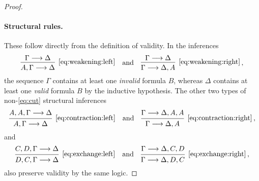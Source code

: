 \documentclass[11pt,a4paper]{article}
\begin{document}
\begin{proof}
    \paragraph{Structural rules.}
    These follow directly from the definition of validity.
    In the inferences
    \begin{equation*}
        \begin{prooftree}
            \hypo{\Gamma\seq\Delta}
            \infer1[\eqref{eq:weakening:left}]{A, \Gamma\seq\Delta}
        \end{prooftree}
        \quad\text{and}\quad
        \begin{prooftree}
            \hypo{\Gamma\seq\Delta}
            \infer1[\eqref{eq:weakening:right}]{\Gamma\seq\Delta, A}
        \end{prooftree}\,,
    \end{equation*}
    the sequence \(\Gamma\) contains at least one \emph{invalid} formula \(B\),
    whereas \(\Delta\) contains at least one \emph{valid} formula \(B\) by the inductive hypothesis.
    The other two types of non-\eqref{eq:cut} structural inferences
    \begin{equation*}
        \begin{prooftree}
            \hypo{A,A,\Gamma\seq\Delta}
            \infer1[\eqref{eq:contraction:left}]{A, \Gamma\seq\Delta}
        \end{prooftree}
        \quad\text{and}\quad
        \begin{prooftree}
            \hypo{\Gamma\seq\Delta,A,A}
            \infer1[\eqref{eq:contraction:right}]{\Gamma\seq\Delta, A}
        \end{prooftree}\,,
    \end{equation*}
    and
    \begin{equation*}
        \begin{prooftree}
            \hypo{C,D,\Gamma\seq\Delta}
            \infer1[\eqref{eq:exchange:left}]{D,C,\Gamma\seq\Delta}
        \end{prooftree}
        \quad\text{and}\quad
        \begin{prooftree}
            \hypo{\Gamma\seq\Delta,C,D}
            \infer1[\eqref{eq:exchange:right}]{\Gamma\seq\Delta, D,C}
        \end{prooftree}\,,
    \end{equation*}
    also preserve validity by the same logic.


\end{proof}
\end{document}
